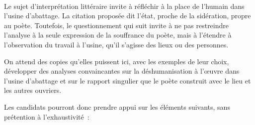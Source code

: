 \vfill{~}\clearpage

{Le sujet d'interprétation littéraire invite à réfléchir à la place de l'humain dans l'usine
d'abattage. La citation proposée dit l'état, proche de la sidération, propre au poète.
Toutefois, le questionnement qui suit invite à ne pas restreindre l'analyse à la seule
expression de la souffrance du poète, mais à l'étendre à l'observation du travail à
l'usine, qu'il s'agisse des lieux ou des personnes.

On attend des copies qu'elles puissent ici, avec les exemples de leur choix,
développer des analyses convaincantes sur la déshumanisation à l'œuvre dans l'usine
d'abattage et sur le rapport singulier que le poète construit avec le lieu et les autres
ouvriers.

Les candidats pourront donc prendre appui sur les éléments suivants, sans
prétention à l'exhaustivité~:

}
